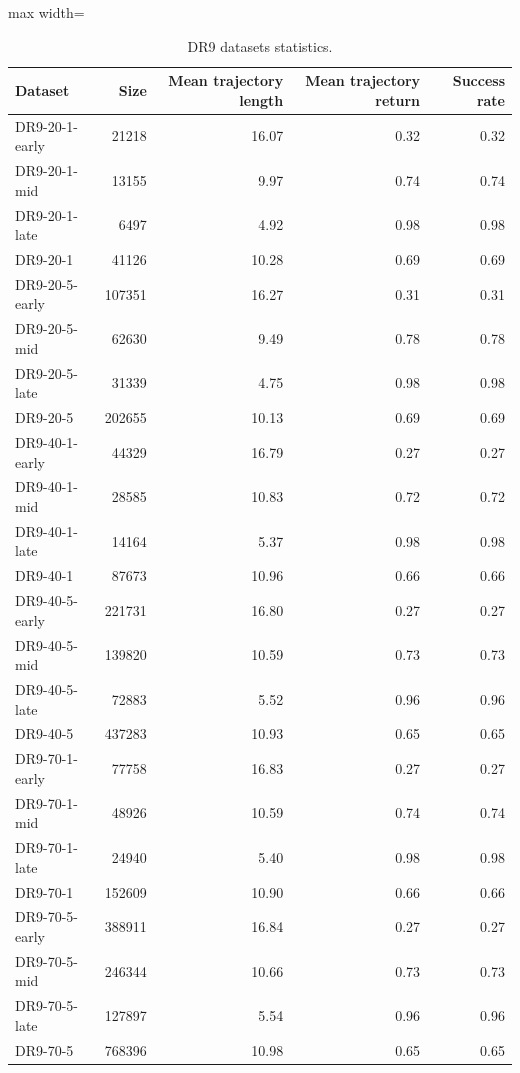 \documentclass{article}
\begin{document}
\begin{table}[ht]
    \label{tab:dr9_stats}
    \begin{center}
        \caption{DR9 datasets statistics.}
    \begin{small}
    \begin{adjustbox}{max width=\columnwidth}
		\begin{tabular}{l|rrrr}
		\toprule
	\textbf{Dataset} & \textbf{Size} & \textbf{Mean trajectory length} & \textbf{Mean trajectory return} & \textbf{Success rate}\\
\midrule
DR9-20-1-early & 21218 & 16.07 & 0.32 & 0.32\\
DR9-20-1-mid & 13155 & 9.97 & 0.74 & 0.74\\
DR9-20-1-late & 6497 & 4.92 & 0.98 & 0.98\\
DR9-20-1 & 41126 & 10.28 & 0.69 & 0.69\\
\midrule
DR9-20-5-early & 107351 & 16.27 & 0.31 & 0.31\\
DR9-20-5-mid & 62630 & 9.49 & 0.78 & 0.78\\
DR9-20-5-late & 31339 & 4.75 & 0.98 & 0.98\\
DR9-20-5 & 202655 & 10.13 & 0.69 & 0.69\\
\midrule
DR9-40-1-early & 44329 & 16.79 & 0.27 & 0.27\\
DR9-40-1-mid & 28585 & 10.83 & 0.72 & 0.72\\
DR9-40-1-late & 14164 & 5.37 & 0.98 & 0.98\\
DR9-40-1 & 87673 & 10.96 & 0.66 & 0.66\\
\midrule
DR9-40-5-early & 221731 & 16.80 & 0.27 & 0.27\\
DR9-40-5-mid & 139820 & 10.59 & 0.73 & 0.73\\
DR9-40-5-late & 72883 & 5.52 & 0.96 & 0.96\\
DR9-40-5 & 437283 & 10.93 & 0.65 & 0.65\\
\midrule
DR9-70-1-early & 77758 & 16.83 & 0.27 & 0.27\\
DR9-70-1-mid & 48926 & 10.59 & 0.74 & 0.74\\
DR9-70-1-late & 24940 & 5.40 & 0.98 & 0.98\\
DR9-70-1 & 152609 & 10.90 & 0.66 & 0.66\\
\midrule
DR9-70-5-early & 388911 & 16.84 & 0.27 & 0.27\\
DR9-70-5-mid & 246344 & 10.66 & 0.73 & 0.73\\
DR9-70-5-late & 127897 & 5.54 & 0.96 & 0.96\\
DR9-70-5 & 768396 & 10.98 & 0.65 & 0.65\\
\bottomrule
\end{tabular}
        \end{adjustbox}
    \end{small}
    \end{center}
    \vskip -0.1in
\end{table}
\end{document}
